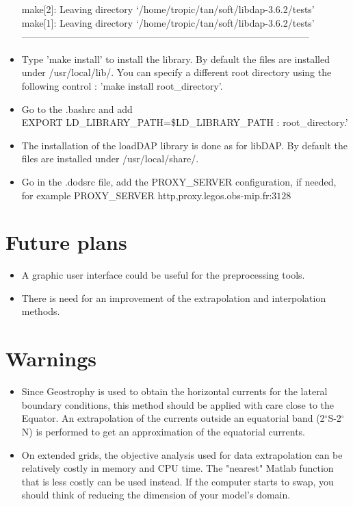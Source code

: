 \begin{itemize}
make[2]: Leaving directory `/home/tropic/tan/soft/libdap-3.6.2/tests'\\
make[1]: Leaving directory `/home/tropic/tan/soft/libdap-3.6.2/tests'\\
------------------------------------------------------------------------------------------\\
\item Type 'make install' to install the library. By default the files are installed under
/usr/local/lib/. You can specify a different root directory using the following control :
'make install root\_directory'.\\
\item Go to the .bashrc and add \\EXPORT LD\_LIBRARY\_PATH=\$LD\_LIBRARY\_PATH
: root\_directory.'\\

\item The installation of the loadDAP library is done as for libDAP. 
By default the files are installed under
/usr/local/share/.

\item Go in the .dodsrc file, add the PROXY\_SERVER configuration, if needed,
    for example PROXY\_SERVER http,proxy.legos.obs-mip.fr:$3128$
\end{itemize}

\section{Future plans}
\begin{itemize}
\item A graphic user interface could be useful for the preprocessing tools.
\item There is need for an improvement of the extrapolation and interpolation
methods.
\end{itemize}

\section{Warnings}
\begin{itemize}
\item Since Geostrophy is used to obtain the horizontal currents for
the lateral boundary conditions, this method should be applied with 
care close to the Equator. An extrapolation of the currents outside 
an equatorial band (2$^\circ$S-2$^\circ$N) is performed to get an 
approximation of the equatorial currents.
\item On extended grids, the objective analysis used for data 
extrapolation can be relatively costly in memory and CPU time. 
The "nearest" Matlab function that is less costly can be used instead.
If the computer starts to swap, you should think of reducing the 
dimension of your model's domain.
\end{itemize}
\newpage